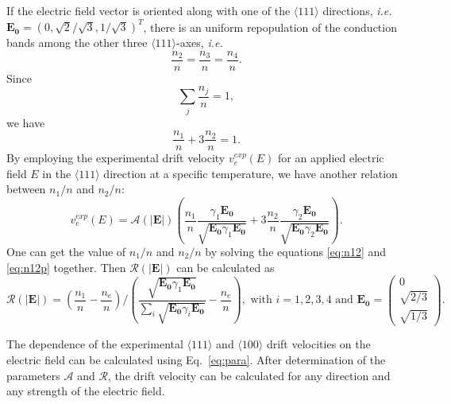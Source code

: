 If the electric field vector is oriented along with one of the $\langle111\rangle$ directions, \textit{i.e.} $\mathbf{E_{0}} = (0,\sqrt{2}/\sqrt{3},1/\sqrt{3})^{T}$, there is an uniform repopulation of the conduction bands among the other three $\langle111\rangle$-axes, \textit{i.e.}
\begin{equation}
  \label{eq:n111}
  \frac{n_{2}}{n} = \frac{n_{3}}{n} = \frac{n_{4}}{n}.
\end{equation}
Since
\begin{equation}
  \label{eq:nsum}
  \displaystyle \sum_{j}\frac{n_{j}}{n} = 1,
\end{equation}
we have
\begin{equation}
  \label{eq:n12}
  \frac{n_{1}}{n} + 3\frac{n_{2}}{n}= 1.
\end{equation}
By employing the experimental drift velocity $v_{e}^{exp}(E)$ for an applied electric field $E$ in the $\langle111\rangle$ direction at a specific temperature, we have another relation between $n_{1}/n$ and $n_{2}/n$:
\begin{equation}
  \label{eq:n12p}
  v_{e}^{exp}(E) =  \mathcal{A}(|\mathbf{E}|) \left(  \frac{n_{1}}{n} \frac{\gamma_{1}\mathbf{E_{0}}}         {\sqrt{\mathbf{E_{0}}\gamma_{1}\mathbf{E_{0}}}} +  3\frac{n_{2}}{n} \frac{\gamma_{2}\mathbf{E_{0}}}         {\sqrt{\mathbf{E_{0}}\gamma_{2}\mathbf{E_{0}}}} \right).
\end{equation}
One can get the value of $n_{1}/n$ and $n_{2}/n$ by solving the equations \ref{eq:n12} and \ref{eq:n12p} together. Then $\mathcal{R}(|\mathbf{E}|)$ can be calculated as
\begin{equation}
  \label{eq:re}
  \mathcal{R(|\mathbf{E}|)} = \left( \frac{n_{1}}{n} - \frac{n_{e}}{n}     \right) / \left(     \frac{\sqrt{\mathbf{E_{0}}\gamma_{1}\mathbf{E_{0}}}}
    {\sum_{i}\sqrt{\mathbf{E_{0}}\gamma_{i}\mathbf{E_{0}}}} -                           \frac{n_{e}}{n} \right),  \mbox{ with }           i=1,2,3,4 \mbox{ and       } \mathbf{E_{0}} = \left( \begin{array}{c} 
      0\\ \sqrt{2/3}\\\sqrt{1/3} \end{array} \right).
\end{equation}

The dependence of the experimental $\langle111\rangle$ and $\langle100\rangle$ drift velocities on the electric field can be calculated using Eq.~\ref{eq:para}. After determination of the parameters $\mathcal{A}$ and $\mathcal{R}$, the drift velocity can be calculated for any direction and any strength of the electric field.

